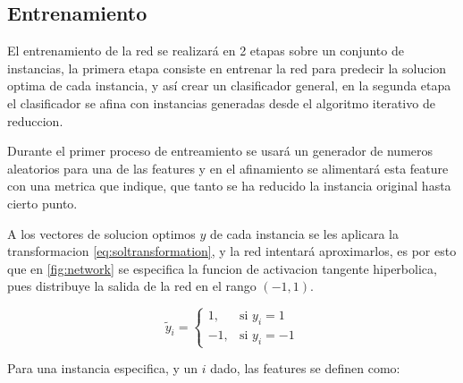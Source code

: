 \documentclass[spanish, a4paper, 12pt, twoside, openany,final]{book}
\numberwithin{equation}{section}                %
\begin{document}
\subsection{Entrenamiento}


El entrenamiento de la red se realizará en 2 etapas sobre un conjunto de instancias, la primera etapa consiste en entrenar la red para predecir la solucion optima de cada instancia, y así crear un clasificador general, en la segunda etapa el clasificador se afina con instancias generadas desde el algoritmo iterativo de reduccion.


Durante el primer proceso de entreamiento se usará un generador de numeros aleatorios para una de las features y en el afinamiento se alimentará esta feature con una metrica que indique, que tanto se ha reducido la instancia original hasta cierto punto.

A los vectores de solucion optimos $y$ de cada instancia se les aplicara la transformacion \ref{eq:soltransformation}, y la red intentará aproximarlos, es por esto que en \ref{fig:network} se especifica la funcion de activacion tangente hiperbolica, pues distribuye la salida de la red en el rango $(-1,1)$.

\begin{equation}
	\tilde{y}_i = \begin{cases}
		 1, & \text{si } y_i = 1 \\
		-1,  & \text{si } y_i = -1
		
			\end{cases}
	\label{eq:soltransformation}	
\end{equation}

Para una instancia especifica, y un $i$ dado, las features se definen como:
\end{document}

